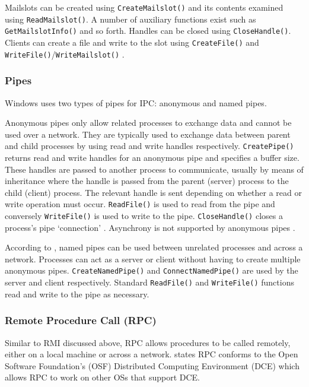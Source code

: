 \documentclass[12pt] {newrucsthesis}    %
\def\code#1{\texttt{#1}}
\begin{document}
          Mailslots can be created using \code{CreateMailslot()} and its contents examined using \code{ReadMailslot()}. A number of
          auxiliary functions exist such as \code{GetMailslotInfo()} and so forth. Handles can be closed using \code{CloseHandle()}.
          Clients can create a file and write to the slot using \code{CreateFile()} and \code{WriteFile()}/\code{WriteMailslot()}
          \citep{IPCWindowsLinkedInSlides}.

        \subsubsection{Pipes}
          Windows uses two types of pipes for IPC: anonymous and named pipes.

          Anonymous pipes only allow related processes to exchange data and cannot be used over a network.
          They are typically used to exchange data between parent and child processes by using read and write
          handles respectively. \code{CreatePipe()} returns read and write handles for an anonymous pipe and
          specifies a buffer size. These handles are passed to another process to communicate, usually by means of
          inheritance where the handle is passed from the parent (server) process to the child (client) process.
          The relevant handle is sent depending on whether a read or write operation must occur. \code{ReadFile()}
          is used to read from the pipe and conversely \code{WriteFile()} is used to write to the pipe.
          \code{CloseHandle()} closes a process's pipe `connection' \citep{MSDN_API}.
          Asynchrony is not supported by anonymous pipes \citep{lewandowski1997interprocess}.

          According to \cite{MSDN_API}, named pipes can be used between unrelated processes and across a network.
          Processes can act as a server or client without having to create multiple anonymous pipes.
          \code{CreateNamedPipe()} and \code{ConnectNamedPipe()} are used by the server and client respectively.
          Standard \code{ReadFile()} and \code{WriteFile()} functions read and write to the pipe as necessary.

        \subsubsection{Remote Procedure Call (RPC)}
          Similar to RMI discussed above, RPC allows procedures to be called remotely, either on a
          local machine or across a network. \cite{MSDN_API} states RPC conforms to the Open Software
          Foundation's (OSF) Distributed Computing Environment (DCE) which allows RPC to work on other
          OSs that support DCE.
\end{document}
